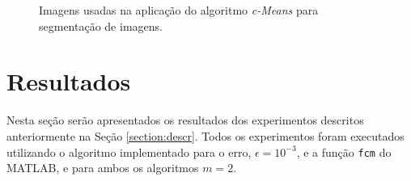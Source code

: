 \documentclass[12pt,a4paper]{article}
\numberwithin{equation}{section}
\begin{document}
\begin{figure}[!htbp]
	\centering
	\caption{Imagens usadas na aplicação do algoritmo \textit{c-Means} para segmentação de imagens.}
	\label{fig:images}
\end{figure}

\section{Resultados} \label{sec:results}

Nesta seção serão apresentados os resultados dos experimentos descritos anteriormente na Seção \ref{section:descr}. Todos os experimentos foram executados utilizando o algoritmo implementado para o erro, $\epsilon=10^{-3}$, e a função \texttt{fcm} do MATLAB, e para ambos os algoritmos $m=2$.
\end{document}
